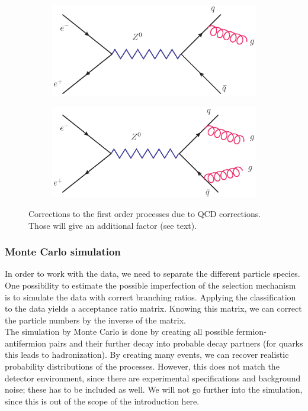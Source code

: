 \begin{figure}[htpb]
\centering
\begin{subfigure}{.5\textwidth}
  \centering
  \includegraphics[width=1.0\linewidth]{figures/QCD1}
  \label{fig:sub1}
\end{subfigure}%
\begin{subfigure}{.5\textwidth}
  \centering
  \includegraphics[width=1.0\linewidth]{figures/QCD2}
  \label{fig:sub2}
\end{subfigure}
\caption{Corrections to the first order processes due to QCD corrections. Those will give an additional factor
(see text).}
\label{fig:QCD_corr}
\end{figure}

\subsubsection{Monte Carlo simulation}
\label{sub:monte_carlo_simulation}
In order to work with the data, we need to separate the different particle species. One possibility to estimate the 
possible imperfection of the selection mechanism is to simulate the data with correct branching ratios. Applying the 
classification to the data yields a acceptance ratio matrix. Knowing this matrix, we can correct the particle numbers
by the inverse of the matrix. \\
The simulation by Monte Carlo is done by creating all possible fermion-antifermion pairs and their further decay into
probable decay partners (for quarks this leads to hadronization). By creating many events, we can recover realistic 
probability distributions of the processes. However, this does not match the detector environment, since there are experimental
specifications and background noise; these has to be included as well. We will not go further into the simulation, since this
is out of the scope of the introduction here. 



